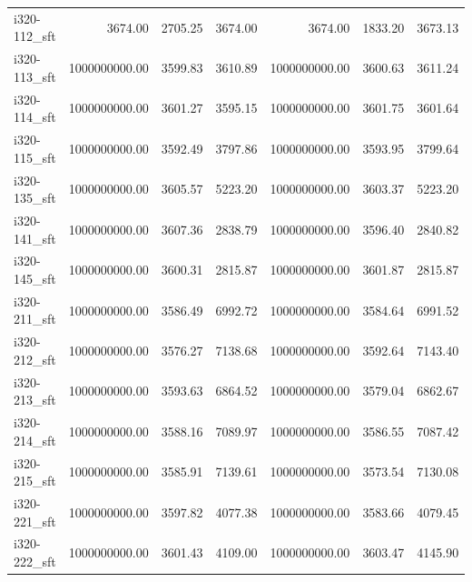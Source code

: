\begin{tabular}{lrrrrrr}
i320-112\_sft &            3674.00 &                2705.25 &          3674.00 &               3674.00 &                   1833.20 &             3673.13 \\
i320-113\_sft &      1000000000.00 &                3599.83 &          3610.89 &         1000000000.00 &                   3600.63 &             3611.24 \\
i320-114\_sft &      1000000000.00 &                3601.27 &          3595.15 &         1000000000.00 &                   3601.75 &             3601.64 \\
i320-115\_sft &      1000000000.00 &                3592.49 &          3797.86 &         1000000000.00 &                   3593.95 &             3799.64 \\
i320-135\_sft &      1000000000.00 &                3605.57 &          5223.20 &         1000000000.00 &                   3603.37 &             5223.20 \\
i320-141\_sft &      1000000000.00 &                3607.36 &          2838.79 &         1000000000.00 &                   3596.40 &             2840.82 \\
i320-145\_sft &      1000000000.00 &                3600.31 &          2815.87 &         1000000000.00 &                   3601.87 &             2815.87 \\
i320-211\_sft &      1000000000.00 &                3586.49 &          6992.72 &         1000000000.00 &                   3584.64 &             6991.52 \\
i320-212\_sft &      1000000000.00 &                3576.27 &          7138.68 &         1000000000.00 &                   3592.64 &             7143.40 \\
i320-213\_sft &      1000000000.00 &                3593.63 &          6864.52 &         1000000000.00 &                   3579.04 &             6862.67 \\
i320-214\_sft &      1000000000.00 &                3588.16 &          7089.97 &         1000000000.00 &                   3586.55 &             7087.42 \\
i320-215\_sft &      1000000000.00 &                3585.91 &          7139.61 &         1000000000.00 &                   3573.54 &             7130.08 \\
i320-221\_sft &      1000000000.00 &                3597.82 &          4077.38 &         1000000000.00 &                   3583.66 &             4079.45 \\
i320-222\_sft &      1000000000.00 &                3601.43 &          4109.00 &         1000000000.00 &                   3603.47 &             4145.90 \\

\end{tabular}
